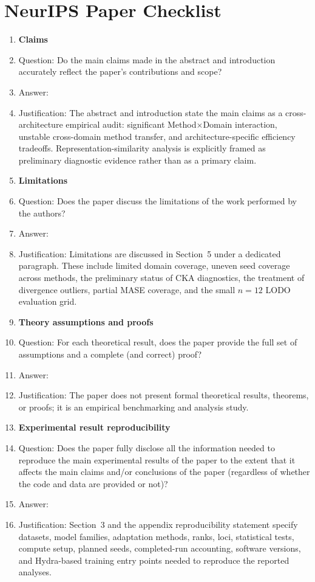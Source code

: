 \section*{NeurIPS Paper Checklist}

\begin{enumerate}

\item {\bf Claims}
    \item[] Question: Do the main claims made in the abstract and introduction accurately reflect the paper's contributions and scope?
    \item[] Answer: \answerYes{}
    \item[] Justification: The abstract and introduction state the main claims as a cross-architecture empirical audit: significant Method$\times$Domain interaction, unstable cross-domain method transfer, and architecture-specific efficiency tradeoffs. Representation-similarity analysis is explicitly framed as preliminary diagnostic evidence rather than as a primary claim.

\item {\bf Limitations}
    \item[] Question: Does the paper discuss the limitations of the work performed by the authors?
    \item[] Answer: \answerYes{}
    \item[] Justification: Limitations are discussed in Section~5 under a dedicated paragraph. These include limited domain coverage, uneven seed coverage across methods, the preliminary status of CKA diagnostics, the treatment of divergence outliers, partial MASE coverage, and the small $n{=}12$ LODO evaluation grid.

\item {\bf Theory assumptions and proofs}
    \item[] Question: For each theoretical result, does the paper provide the full set of assumptions and a complete (and correct) proof?
    \item[] Answer: \answerNA{}
    \item[] Justification: The paper does not present formal theoretical results, theorems, or proofs; it is an empirical benchmarking and analysis study.

\item {\bf Experimental result reproducibility}
    \item[] Question: Does the paper fully disclose all the information needed to reproduce the main experimental results of the paper to the extent that it affects the main claims and/or conclusions of the paper (regardless of whether the code and data are provided or not)?
    \item[] Answer: \answerYes{}
    \item[] Justification: Section~3 and the appendix reproducibility statement specify datasets, model families, adaptation methods, ranks, loci, statistical tests, compute setup, planned seeds, completed-run accounting, software versions, and Hydra-based training entry points needed to reproduce the reported analyses.


\end{enumerate}
